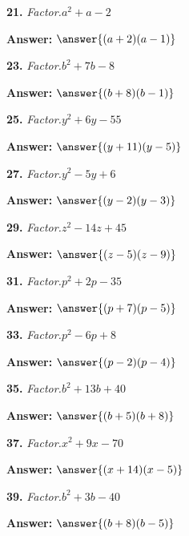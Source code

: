 \documentclass{ximera}
\begin{document}
\begin{problem}
\textbf{21.} \emph{Factor.}\quad $a^2 + a - 2$

\textbf{Answer:} $\answer{(a +2)(a -1)}$
\end{problem}

\begin{problem}
\textbf{23.} \emph{Factor.}\quad $b^2 + 7b - 8$

\textbf{Answer:} $\answer{(b +8)(b -1)}$
\end{problem}

\begin{problem}
\textbf{25.} \emph{Factor.}\quad $y^2 + 6y - 55$

\textbf{Answer:} $\answer{(y +11)(y -5)}$
\end{problem}

\begin{problem}
\textbf{27.} \emph{Factor.}\quad $y^2 - 5y + 6$

\textbf{Answer:} $\answer{(y -2)(y -3)}$
\end{problem}

\begin{problem}
\textbf{29.} \emph{Factor.}\quad $z^2 - 14z + 45$

\textbf{Answer:} $\answer{(z -5)(z -9)}$
\end{problem}

\begin{problem}
\textbf{31.} \emph{Factor.}\quad $p^2 + 2p - 35$

\textbf{Answer:} $\answer{(p +7)(p -5)}$
\end{problem}

\begin{problem}
\textbf{33.} \emph{Factor.}\quad $p^2 - 6p + 8$

\textbf{Answer:} $\answer{(p -2)(p -4)}$
\end{problem}

\begin{problem}
\textbf{35.} \emph{Factor.}\quad $b^2 + 13b + 40$

\textbf{Answer:} $\answer{(b +5)(b +8)}$
\end{problem}

\begin{problem}
\textbf{37.} \emph{Factor.}\quad $x^2 + 9x - 70$

\textbf{Answer:} $\answer{(x +14)(x -5)}$
\end{problem}

\begin{problem}
\textbf{39.} \emph{Factor.}\quad $b^2 + 3b - 40$

\textbf{Answer:} $\answer{(b +8)(b -5)}$
\end{problem}
\end{document}
